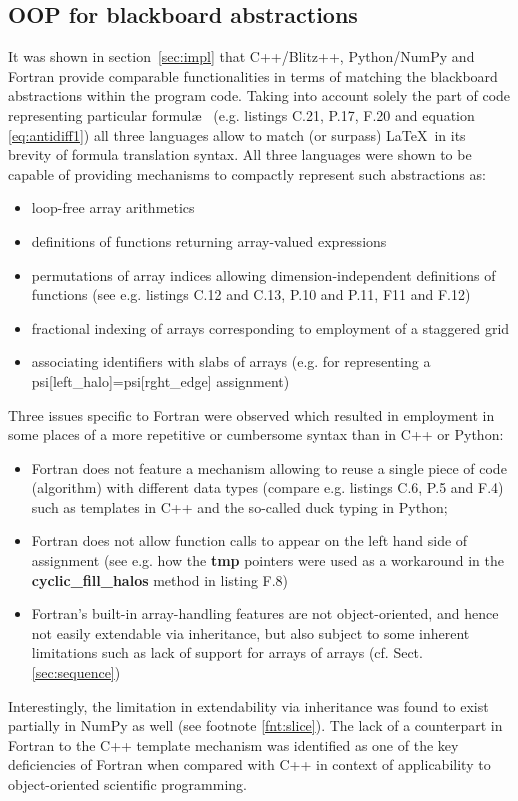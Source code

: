 \documentclass[final,5p,times,twocolumn]{elsarticle}
\newcommand{\prog}[1]{{\rm\bf#1}}
\begin{document}
  \subsection{OOP for blackboard abstractions}

  It was shown in section~\ref{sec:impl} that C++/Blitz++, Python/NumPy and Fortran
    provide comparable functionalities in terms of matching the blackboard abstractions
    within the program code.
  Taking into account solely the part of code representing particular formul\ae~
    (e.g. listings C.21, P.17, F.20 and equation \ref{eq:antidiff1}) all three
    languages allow to match (or surpass) \LaTeX~in its brevity of formula translation syntax.
  All three languages were shown to be capable of providing mechanisms to compactly represent such abstractions as:
  \begin{itemize}
    \item{loop-free array arithmetics}
    \item{definitions of functions returning array-valued expressions}
    \item{permutations of array indices allowing dimension-independent definitions
      of functions (see e.g. listings C.12 and C.13, P.10 and P.11, F11 and F.12)}
    \item{fractional indexing of arrays corresponding to employment of a staggered grid}
    \item{associating identifiers with slabs of arrays (e.g. for representing 
      a psi[left\_halo]=psi[rght\_edge] assignment)}
  \end{itemize}
  Three issues specific to Fortran were observed which 
    resulted in employment in some places of a more repetitive or cumbersome syntax than in C++ or Python:
  \begin{itemize}
    \item{Fortran does not feature a mechanism allowing to reuse a single piece of code (algorithm)
      with different data types (compare e.g. listings C.6, P.5 and F.4) such as
      templates in C++ and the so-called duck typing in Python;}
    \item{Fortran does not allow function calls to appear on the left hand side
      of assignment (see e.g. how the \prog{tmp} pointers were used as a workaround in the \prog{cyclic\_fill\_halos}
      method in listing F.8)}
    \item{Fortran's built-in array-handling features are not object-oriented,
      and hence not easily extendable via inheritance, but also subject to
      some inherent limitations such as lack of support for arrays of arrays 
      (cf. Sect. \ref{sec:sequence})}
  \end{itemize}
  Interestingly, the limitation in extendability via inheritance was found to
    exist partially in NumPy as well (see footnote \ref{fnt:slice}).
  The lack of a counterpart in Fortran to the C++ template mechanism was identified
    \citep{Cary_et_al_1997}
    as one of the key deficiencies of Fortran when compared with C++ in context 
    of applicability to object-oriented scientific programming.
\end{document}
